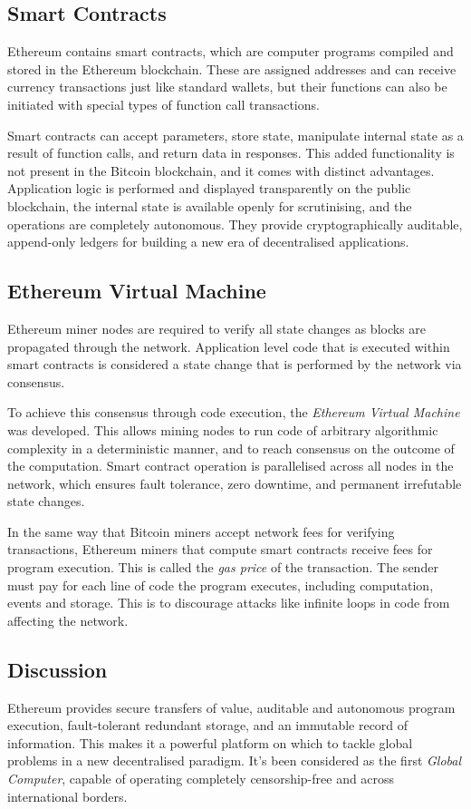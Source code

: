 \subsection{Smart Contracts}
Ethereum contains smart contracts, which are computer programs compiled and stored in the Ethereum blockchain. These are assigned addresses and can receive currency transactions just like standard wallets, but their functions can also be initiated with special types of function call transactions.

Smart contracts can accept parameters, store state, manipulate internal state as a result of function calls, and return data in responses. This added functionality is not present in the Bitcoin blockchain, and it comes with distinct advantages. Application logic is performed and displayed transparently on the public blockchain, the internal state is available openly for scrutinising, and the operations are completely autonomous. They provide cryptographically auditable, append-only ledgers for building a new era of decentralised applications.

\subsection{Ethereum Virtual Machine}
Ethereum miner nodes are required to verify all state changes as blocks are propagated through the network. Application level code that is executed within smart contracts is considered a state change that is performed by the network via consensus. 

To achieve this consensus through code execution, the \textit{Ethereum Virtual Machine} was developed. This allows mining nodes to run code of arbitrary algorithmic complexity in a deterministic manner, and to reach consensus on the outcome of the computation. Smart contract operation is parallelised across all nodes in the network, which ensures fault tolerance, zero downtime, and permanent irrefutable state changes.

In the same way that Bitcoin miners accept network fees for verifying transactions, Ethereum miners that compute smart contracts receive fees for program execution. This is called the \textit{gas price} of the transaction. The sender must pay for each line of code the program executes, including computation, events and storage. This is to discourage attacks like infinite loops in code from affecting the network.

\subsection{Discussion}
Ethereum provides secure transfers of value, auditable and autonomous program execution, fault-tolerant redundant storage, and an immutable record of information. This makes it a powerful platform on which to tackle global problems in a new decentralised paradigm. It's been considered as the first \textit{Global Computer}, capable of operating completely censorship-free and across international borders.

